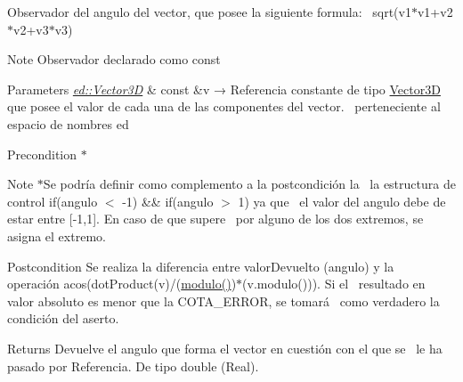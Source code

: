 Observador del angulo del vector, que posee la siguiente formula\+:~\newline
 sqrt(v1$\ast$v1+v2$\ast$v2+v3$\ast$v3) 

\begin{DoxyNote}{Note}
Observador declarado como const
\end{DoxyNote}

\begin{DoxyParams}{Parameters}
{\em \mbox{\hyperlink{classed_1_1Vector3D}{ed\+::\+Vector3D}}} & const \&v → Referencia constante de tipo \mbox{\hyperlink{classed_1_1Vector3D}{Vector3D}}~\newline
 que posee el valor de cada una de las componentes del vector.~\newline
 perteneciente al espacio de nombres ed\\
\hline
\end{DoxyParams}
\begin{DoxyPrecond}{Precondition}
$\ast$
\end{DoxyPrecond}
\begin{DoxyNote}{Note}
$\ast$\+Se podría definir como complemento a la postcondición la~\newline
 la estructura de control if(angulo $<$ -\/1) \&\& if(angulo $>$ 1) ya que~\newline
 el valor del angulo debe de estar entre \mbox{[}-\/1,1\mbox{]}. En caso de que supere~\newline
 por alguno de los dos extremos, se asigna el extremo.
\end{DoxyNote}
\begin{DoxyPostcond}{Postcondition}
Se realiza la diferencia entre valor\+Devuelto (angulo) y la ~\newline
 operación acos(dot\+Product(v)/(\mbox{\hyperlink{classed_1_1Vector3D_a9db1b9e9d7634efeb88f60130283bc9a}{modulo()}})$\ast$(v.\+modulo())). Si el~\newline
 resultado en valor absoluto es menor que la C\+O\+T\+A\+\_\+\+E\+R\+R\+OR, se tomará~\newline
 como verdadero la condición del aserto.
\end{DoxyPostcond}
\begin{DoxyReturn}{Returns}
Devuelve el angulo que forma el vector en cuestión con el que se~\newline
 le ha pasado por Referencia. De tipo double (Real). 
\end{DoxyReturn}
\mbox{\label{classed_1_1Vector3D_a0b9663bbc1b3c3237d0d83583b79597d}} 
